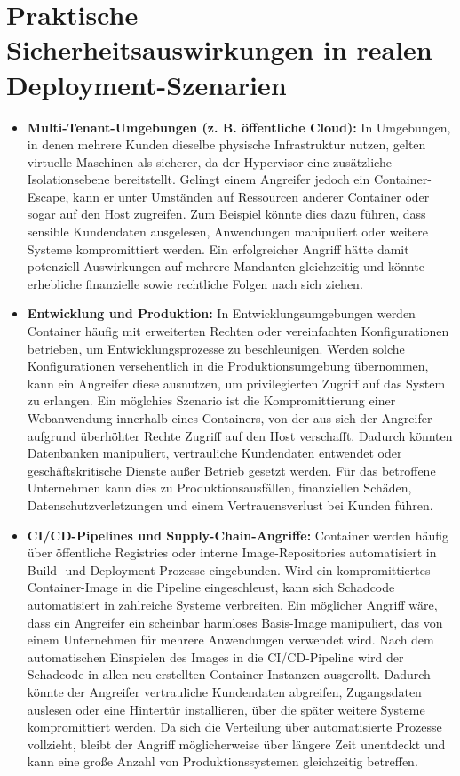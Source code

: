 \documentclass[conference]{IEEEtran}
\begin{document}
 
\section*{Praktische Sicherheitsauswirkungen in realen Deployment-Szenarien}
\begin{itemize}
    \item \textbf{Multi-Tenant-Umgebungen (z. B. öffentliche Cloud):}  
    In Umgebungen, in denen mehrere Kunden dieselbe physische Infrastruktur nutzen, gelten virtuelle Maschinen als sicherer, da der Hypervisor eine zusätzliche Isolationsebene bereitstellt. 
    Gelingt einem Angreifer jedoch ein Container-Escape, kann er unter Umständen auf Ressourcen anderer Container oder sogar auf den Host zugreifen. 
    Zum Beispiel könnte dies dazu führen, dass sensible Kundendaten ausgelesen, Anwendungen manipuliert oder weitere Systeme kompromittiert werden. 
    Ein erfolgreicher Angriff hätte damit potenziell Auswirkungen auf mehrere Mandanten gleichzeitig und könnte erhebliche finanzielle sowie rechtliche Folgen nach sich ziehen.

    \item \textbf{Entwicklung und Produktion:}  
    In Entwicklungsumgebungen werden Container häufig mit erweiterten Rechten oder vereinfachten Konfigurationen betrieben, um Entwicklungsprozesse zu beschleunigen. 
    Werden solche Konfigurationen versehentlich in die Produktionsumgebung übernommen, kann ein Angreifer diese ausnutzen, um privilegierten Zugriff auf das System zu erlangen. 
    Ein möglchies Szenario ist die Kompromittierung einer Webanwendung innerhalb eines Containers, von der aus sich der Angreifer aufgrund überhöhter Rechte Zugriff auf den Host verschafft. 
    Dadurch könnten Datenbanken manipuliert, vertrauliche Kundendaten entwendet oder geschäftskritische Dienste außer Betrieb gesetzt werden. 
    Für das betroffene Unternehmen kann dies zu Produktionsausfällen, finanziellen Schäden, Datenschutzverletzungen und einem Vertrauensverlust bei Kunden führen.

    \item \textbf{CI/CD-Pipelines und Supply-Chain-Angriffe:}  
    Container werden häufig über öffentliche Registries oder interne Image-Repositories automatisiert in Build- und Deployment-Prozesse eingebunden. 
    Wird ein kompromittiertes Container-Image in die Pipeline eingeschleust, kann sich Schadcode automatisiert in zahlreiche Systeme verbreiten. 
    Ein möglicher Angriff wäre, dass ein Angreifer ein scheinbar harmloses Basis-Image manipuliert, das von einem Unternehmen für mehrere Anwendungen verwendet wird. 
    Nach dem automatischen Einspielen des Images in die CI/CD-Pipeline wird der Schadcode in allen neu erstellten Container-Instanzen ausgerollt. 
    Dadurch könnte der Angreifer vertrauliche Kundendaten abgreifen, Zugangsdaten auslesen oder eine Hintertür installieren, über die später weitere Systeme kompromittiert werden. 
    Da sich die Verteilung über automatisierte Prozesse vollzieht, bleibt der Angriff möglicherweise über längere Zeit unentdeckt und kann eine große Anzahl von Produktionssystemen gleichzeitig betreffen.
\end{itemize} 
\end{document}
